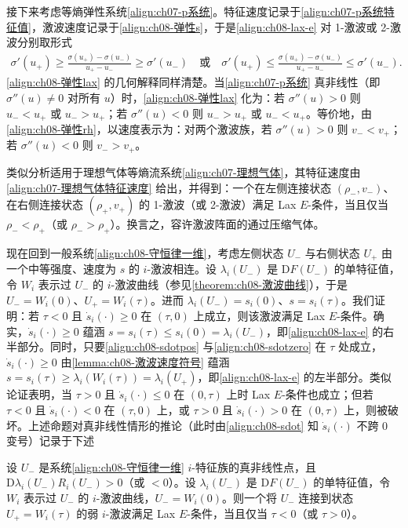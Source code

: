 \documentclass[../../main.tex]{subfiles}
\begin{document}
接下来考虑等熵弹性系统\eqref{align:ch07-p系统}。特征速度记录于\eqref{align:ch07-p系统特征值}，激波速度记录于\eqref{align:ch08-弹性s}，于是\eqref{align:ch08-lax-e} 对 1-激波或 2-激波分别取形式
\begin{align}
\sigma'(u_+)\geqslant\frac{\sigma(u_+)-\sigma(u_-)}{u_+-u_-}\geqslant\sigma'(u_-)
\quad\text{或}\quad
\sigma'(u_+)\leqslant\frac{\sigma(u_+)-\sigma(u_-)}{u_+-u_-}\leqslant\sigma'(u_-).
\label{align:ch08-弹性lax}
\end{align}
\eqref{align:ch08-弹性lax} 的几何解释同样清楚。当\eqref{align:ch07-p系统} 真非线性（即 $\sigma''(u)\neq0$ 对所有 $u$）时，\eqref{align:ch08-弹性lax} 化为：若 $\sigma''(u)>0$ 则 $u_-<u_+$ 或 $u_->u_+$；若 $\sigma''(u)<0$ 则 $u_->u_+$ 或 $u_-<u_+$。等价地，由\eqref{align:ch08-弹性rh}，以速度表示为：对两个激波族，若 $\sigma''(u)>0$ 则 $v_-<v_+$；若 $\sigma''(u)<0$ 则 $v_->v_+$。

类似分析适用于理想气体等熵流系统\eqref{align:ch07-理想气体}，其特征速度由\eqref{align:ch07-理想气体特征速度} 给出，并得到：一个在左侧连接状态 $(\rho_-,v_-)$、在右侧连接状态 $(\rho_+,v_+)$ 的 1-激波（或 2-激波）满足 Lax $E$-条件，当且仅当 $\rho_-<\rho_+$（或 $\rho_->\rho_+$）。换言之，容许激波阵面的通过压缩气体。

现在回到一般系统\eqref{align:ch08-守恒律一维}，考虑左侧状态 $U_-$ 与右侧状态 $U_+$ 由一个中等强度、速度为 $s$ 的 $i$-激波相连。设 $\lambda_i(U_-)$ 是 $\mathrm{D}F(U_-)$ 的单特征值，令 $W_i$ 表示过 $U_-$ 的 $i$-激波曲线（参见\cref{theorem:ch08-激波曲线}），于是 $U_-=W_i(0)$、$U_+=W_i(\tau)$。进而 $\lambda_i(U_-)=s_i(0)$、$s=s_i(\tau)$。我们证明：若 $\tau<0$ 且 $\dot s_i(\cdot)\geqslant0$ 在 $(\tau,0)$ 上成立，则该激波满足 Lax $E$-条件。确实，$\dot s_i(\cdot)\geqslant0$ 蕴涵 $s=s_i(\tau)\leqslant s_i(0)=\lambda_i(U_-)$，即\eqref{align:ch08-lax-e} 的右半部分。同时，只要\eqref{align:ch08-sdotpos} 与\eqref{align:ch08-sdotzero} 在 $\tau$ 处成立，$\dot s_i(\cdot)\geqslant0$ 由\cref{lemma:ch08-激波速度符号} 蕴涵 $s=s_i(\tau)\geqslant\lambda_i(W_i(\tau))=\lambda_i(U_+)$，即\eqref{align:ch08-lax-e} 的左半部分。类似论证表明，当 $\tau>0$ 且 $\dot s_i(\cdot)\leqslant0$ 在 $(0,\tau)$ 上时 Lax $E$-条件也成立；但若 $\tau<0$ 且 $\dot s_i(\cdot)<0$ 在 $(\tau,0)$ 上，或 $\tau>0$ 且 $\dot s_i(\cdot)>0$ 在 $(0,\tau)$ 上，则被破坏。上述命题对真非线性情形的推论（此时由\eqref{align:ch08-sdot} 知 $\dot s_i(\cdot)$ 不跨 $0$ 变号）记录于下述

\begin{theorem}\label{theorem:ch08-弱激波lax}
设 $U_-$ 是系统\eqref{align:ch08-守恒律一维} $i$-特征族的真非线性点，且 $\mathrm{D}\lambda_i(U_-)R_i(U_-)>0$（或 $<0$）。设 $\lambda_i(U_-)$ 是 $\mathrm{D}F(U_-)$ 的单特征值，令 $W_i$ 表示过 $U_-$ 的 $i$-激波曲线，$U_-=W_i(0)$。则一个将 $U_-$ 连接到状态 $U_+=W_i(\tau)$ 的弱 $i$-激波满足 Lax $E$-条件，当且仅当 $\tau<0$（或 $\tau>0$）。
\end{theorem}
\end{document}

